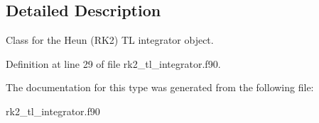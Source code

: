 \subsection{Detailed Description}
Class for the Heun (R\+K2) TL integrator object. 

Definition at line 29 of file rk2\+\_\+tl\+\_\+integrator.\+f90.



The documentation for this type was generated from the following file\+:\begin{DoxyCompactItemize}
\item 
rk2\+\_\+tl\+\_\+integrator.\+f90\end{DoxyCompactItemize}
